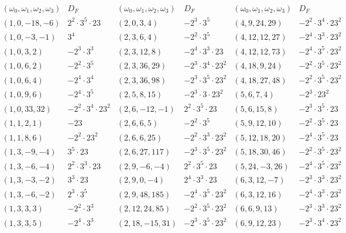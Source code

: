 $$
\begin{array}{cc|cc|cc} 
(\omega_0,\omega_1,\omega_2,\omega_3) & D_F & (\omega_0,\omega_1,\omega_2,\omega_3)  & D_F & (\omega_0,\omega_1,\omega_2,\omega_3)  & D_F \\ \hline
(1,0,-18,-6) & 2^2 \cdot 3^5 \cdot 23 & (2, 0, 3, 4) & -2^3 \cdot 3^5  & (4, 9, 24, 29) & -2^2 \cdot 3^4 \cdot 23^2 \\
(1,0,-3,-1) & 3^4 &   (2, 3, 6, 4) & -2^2 \cdot 3^5  & (4,12,12,27) & -2^4 \cdot 3^3 \cdot 23^2 \\
(1,0,3,2) & -2^3 \cdot 3^3 & (2, 3, 12, 8) & -2^4 \cdot 3^3 \cdot 23 & (4,12,12,73) & -2^4 \cdot 3^5 \cdot 23^2 \\
(1,0,6,2) & -2^2 \cdot 3^5 & (2, 3, 36, 29) & -2^3 \cdot 3^4 \cdot 23^2  & (4, 18, 9, 24) & -2^2 \cdot 3^5 \cdot 23^2  \\
(1,0,6,4) & -2^4 \cdot 3^4 & (2, 3, 36, 98) & -2^3 \cdot 3^5 \cdot 23^2  & (4, 18, 27, 48) & -2^2 \cdot 3^5 \cdot 23^2 \\
(1,0,9,6) & -2^4 \cdot 3^5 & (2, 5, 8, 15) & -2^3 \cdot 3 \cdot 23^2  & (5, 6, 7, 4) & -2^3 \cdot  23^2 \\
(1,0,33,32) & -2^2 \cdot 3^4 \cdot 23^2 & (2, 6, -12, -1) & 2^2 \cdot 3^5 \cdot 23 & (5, 6, 15, 8) & -2^3 \cdot 3^5 \cdot 23 \\
(1,1,2,1) & -23 & (2, 6, 6, 5) & -2^2 \cdot 3^5  & (5, 9, 12, 10) & -2^2 \cdot 3^5 \cdot 23 \\
(1,1,8,6) & -2^2 \cdot 23^2 & (2, 6, 6, 25) & -2^2 \cdot 3^3 \cdot 23^2  & (5, 12, 18, 20) & -2^4 \cdot 3^5 \cdot 23 \\
(1, 3, -9, -4) & 3^5 \cdot 23 & (2, 6, 27, 117) & -2^3 \cdot 3^5 \cdot 23^2 & (5, 18, 30, 46) & -2^2 \cdot 3^5 \cdot 23^2 \\
(1,3,-6,-4) & 2^2 \cdot 3^3 \cdot 23 & (2, 9, -6, -4) & 2^2 \cdot 3^5 \cdot 23 & (5,24,-3,26) & -2^4 \cdot 3^5 \cdot 23^2  \\
(1,3,-3,-2) & 3^3\cdot 23 & (2, 9, 0, -4) & 2^4 \cdot 3^3 \cdot 23 & (6, 3, 12, -7) & -2^3 \cdot 3^3 \cdot 23^2 \\
(1,3,-6,-2) & 2^3 \cdot 3^5 & (2,9,48,185) & -2^4 \cdot 3^5 \cdot 23^2 & (6, 3, 12, 16) & -2^4 \cdot 3^3 \cdot 23^2 \\
(1,3,3,3) & -2^2 \cdot 3^3 & (2, 12, 24, 85) & -2^2 \cdot 3^5 \cdot 23^2 & (6, 6, 9, 13) & -2^3 \cdot 3^3 \cdot 23^2 \\
(1,3,3,5) & -2^4 \cdot 3^3 & (2, 18, -15, 31) & -2^3 \cdot 3^5 \cdot 23^2 & (6, 9, 12, 23) & -2^3 \cdot 3^4 \cdot 23^2 \\

\end{array}$$
